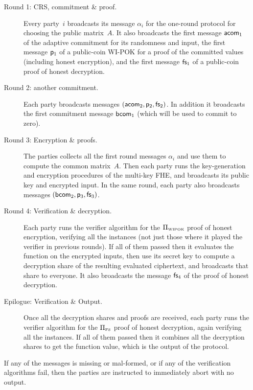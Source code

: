 \begin{description}

\item[Round 1: CRS, commitment \& proof.]
Every party~$i$ broadcasts its message $\alpha_i$ for the one-round protocol for choosing the public matrix~$A$. It also broadcasts the first message $\mathsf{acom}_1$ of the adaptive commitment for its randomness and input, the first message $\mathsf{p}_1$ of a public-coin WI-POK for a proof of the committed values (including honest encryption), and the first message $\mathsf{fs}_1$ of a public-coin proof of honest decryption.

\item[Round 2: another commitment.]
Each party broadcasts messages $(\mathsf{acom}_2,\mathsf{p}_2,\mathsf{fs}_2)$. %
In addition it broadcasts the first commitment message ${\mathsf{bcom}}_1$ (which will be used to commit to zero).

\item[Round 3: Encryption \& proofs.] The parties collects all the first round messages $\alpha_i$ and use them to compute the common matrix~$A$. Then each party runs the key-generation and encryption procedures of the multi-key FHE, and broadcasts its public key and encrypted input.
In the same round, each party also broadcasts messages $({\mathsf{bcom}}_2,\mathsf{p}_3,\mathsf{fs}_3)$.

\item[Round 4: Verification \& decryption.]
Each party runs the verifier algorithm for the $\Pi_{\scriptscriptstyle\mathrm{WIPOK}}$ proof of honest encryption, verifying all the instances (not just those where it played the verifier in previous rounds). If all of them passed then it evaluates the function on the encrypted inputs, then use its secret key to compute a decryption share of the resulting evaluated ciphertext, and broadcasts that share to everyone.
It also broadcasts the message $\mathsf{fs}_4$ of the proof of honest decryption.

\item[Epilogue: Verification \& Output.] Once all the decryption shares and proofs are received, each party runs the verifier algorithm for the $\Pi_{\scriptscriptstyle\mathrm{FS}}$ proof of honest decryption, again verifying all the instances. If all of them passed then it combines all the decryption shares to get the function value, which is the output of the protocol.
\end{description}
If any of the messages is missing or mal-formed, or if any of the verification algorithms fail, then the parties are instructed to immediately abort with no output.
